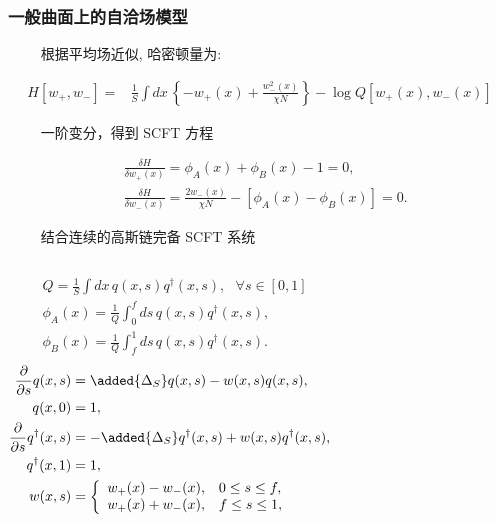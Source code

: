 \documentclass[notheorems,serif]{beamer}
\begin{document}
\begin{frame}
    \frametitle{一般曲面上的自洽场模型}

~~~~ 根据平均场近似, 哈密顿量为:
\begin{tiny}
\begin{equation}
        \begin{aligned}
          H[w_+, w_-] = &
  \frac{1}{S}\int d x\, \left\{ 
  -w_+(x) + \frac{w_-^2(x)}{\chi N} 
        \right\} -\log Q[w_+(x), w_-(x)]
        \label{eq:hamiltonian}
    \end{aligned}
\end{equation}
\end{tiny}

~~~~ 一阶变分，得到 SCFT 方程
\begin{tiny}
    \begin{align}
	& \frac{\delta H}{\delta w_+(x)} = \phi_A(x) + \phi_B(x) - 1 = 0,
	\label{eq:scftwplus}
	\\
	& \frac{\delta H}{\delta w_-(x)} = 
   \frac{2 w_-(x)}{\chi N} - [\phi_A(x) - \phi_B(x)] = 0.
	\label{eq:scftwminus}
    \end{align}
\end{tiny}
~~~~ 结合连续的高斯链完备 SCFT 系统

\begin{tiny}
\begin{columns}
        \column{6cm}
    \begin{align}
  & Q = \frac{1}{S}\int
    d x\,q(x,s)q^\dag(x,s), ~~~ \forall s\in[0,1]
    \label{eq:scft:Q}
  \\
  & \phi_A(x) =
  \frac{1}{Q}\int_0^f ds\,q(x,s)q^{\dag}(x,s),
  \label{eq:scft:phiA}
  \\
  & \phi_B(x) =
  \frac{1}{Q}\int_f^1 ds\,q(x,s)q^{\dag}(x,s).
  \label{eq:scft:phiB}
\end{align}
    \column{6cm}
\begin{equation}
  \label{eq:MDE}
	\begin{aligned}
  \frac{\partial }{\partial s}q(x,s) &=
        \added{\Delta_S} q(x, s) - w(x,s) q(x,s), 
	\\
  q(x,0) &= 1,
  \\
    \frac{\partial }{\partial s}q^\dag(x,s) &=
        - \added{\Delta_S} q^\dag(x, s) + w(x,s)q^\dag(x,s), 
	\\
  q^\dag(x,1) &= 1,
    \\
    w(x,s) &= \left\{   
	\begin{array}{rl}
		w_+(x)-w_-(x), &  0\leq s \leq f,
		\\
		w_+(x) +w_-(x), &  f\leq s \leq 1,
	\end{array}
\right.
	\end{aligned}
\end{equation}
    \end{columns}
\end{tiny}
\end{frame}
\end{document}
